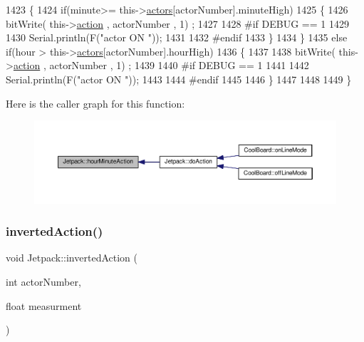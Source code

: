\begin{DoxyCode}
1423     \{
1424         \textcolor{keywordflow}{if}(minute>= this->\hyperlink{class_jetpack_a7e16d2f97837f9712a2e6de1c50d99db}{actors}[actorNumber].minuteHigh)
1425         \{
1426             bitWrite( this->\hyperlink{class_jetpack_aca3142925a7b0834b34ae91d26af7765}{action} , actorNumber , 1) ;
1427 
1428 \textcolor{preprocessor}{        #if DEBUG == 1 }
1429 
1430             Serial.println(F(\textcolor{stringliteral}{"actor ON "}));
1431 
1432 \textcolor{preprocessor}{        #endif  }
1433         \}
1434     \}
1435     \textcolor{keywordflow}{else} \textcolor{keywordflow}{if}(hour > this->\hyperlink{class_jetpack_a7e16d2f97837f9712a2e6de1c50d99db}{actors}[actorNumber].hourHigh)
1436     \{
1437 
1438         bitWrite( this->\hyperlink{class_jetpack_aca3142925a7b0834b34ae91d26af7765}{action} , actorNumber , 1) ;
1439 
1440 \textcolor{preprocessor}{    #if DEBUG == 1 }
1441 
1442         Serial.println(F(\textcolor{stringliteral}{"actor ON "}));
1443 
1444 \textcolor{preprocessor}{    #endif      }
1445 
1446     \}
1447 
1448     
1449 \}
\end{DoxyCode}
Here is the caller graph for this function\+:\nopagebreak
\begin{figure}[H]
\begin{center}
\leavevmode
\includegraphics[width=350pt]{df/d1d/class_jetpack_ae01c13c785ebdf1b0bb5500234aba1bd_icgraph}
\end{center}
\end{figure}
\mbox{\label{class_jetpack_adacfc35fab4a621357caf98ce1c9cb54}} 
\subsubsection{\texorpdfstring{inverted\+Action()}{invertedAction()}}
{\footnotesize\ttfamily void Jetpack\+::inverted\+Action (\begin{DoxyParamCaption}\item[{int}]{actor\+Number,  }\item[{float}]{measurment }\end{DoxyParamCaption})}

